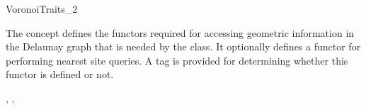 

\begin{ccRefConcept}{VoronoiTraits_2}

\ccDefinition

The concept  defines the functors required for
accessing geometric information in the Delaunay graph that is needed by the
 class.
It optionally defines a functor for performing nearest site queries. A
tag is provided for determining whether this functor is defined or not.

\ccRefines
{}, , 


\end{ccRefConcept}
